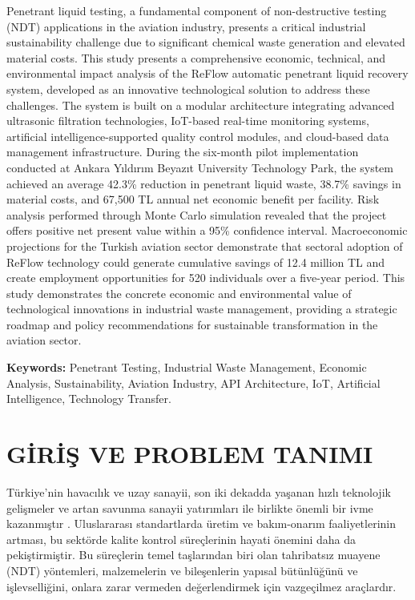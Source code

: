 \documentclass[12pt,a4paper]{article}
\begin{document}
Penetrant liquid testing, a fundamental component of non-destructive testing (NDT) applications in the aviation industry, presents a critical industrial sustainability challenge due to significant chemical waste generation and elevated material costs. This study presents a comprehensive economic, technical, and environmental impact analysis of the ReFlow automatic penetrant liquid recovery system, developed as an innovative technological solution to address these challenges. The system is built on a modular architecture integrating advanced ultrasonic filtration technologies, IoT-based real-time monitoring systems, artificial intelligence-supported quality control modules, and cloud-based data management infrastructure. During the six-month pilot implementation conducted at Ankara Yıldırım Beyazıt University Technology Park, the system achieved an average 42.3\% reduction in penetrant liquid waste, 38.7\% savings in material costs, and 67,500 TL annual net economic benefit per facility. Risk analysis performed through Monte Carlo simulation revealed that the project offers positive net present value within a 95\% confidence interval. Macroeconomic projections for the Turkish aviation sector demonstrate that sectoral adoption of ReFlow technology could generate cumulative savings of 12.4 million TL and create employment opportunities for 520 individuals over a five-year period. This study demonstrates the concrete economic and environmental value of technological innovations in industrial waste management, providing a strategic roadmap and policy recommendations for sustainable transformation in the aviation sector.

\textbf{Keywords:} Penetrant Testing, Industrial Waste Management, Economic Analysis, Sustainability, Aviation Industry, API Architecture, IoT, Artificial Intelligence, Technology Transfer.


\newpage
\tableofcontents
\newpage

\section{GİRİŞ VE PROBLEM TANIMI}

Türkiye'nin havacılık ve uzay sanayii, son iki dekadda yaşanan hızlı teknolojik gelişmeler ve artan savunma sanayii yatırımları ile birlikte önemli bir ivme kazanmıştır \cite{ssb2023defense}. Uluslararası standartlarda üretim ve bakım-onarım faaliyetlerinin artması, bu sektörde kalite kontrol süreçlerinin hayati önemini daha da pekiştirmiştir. Bu süreçlerin temel taşlarından biri olan tahribatsız muayene (NDT) yöntemleri, malzemelerin ve bileşenlerin yapısal bütünlüğünü ve işlevselliğini, onlara zarar vermeden değerlendirmek için vazgeçilmez araçlardır.
\end{document}
